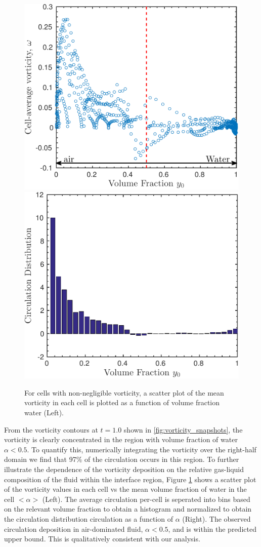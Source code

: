 \begin{figure}[h]
  \centering
  \includegraphics[width=.48\textwidth]{./figs/lung_figs/vorticity_vs_y0} \hfill
  \includegraphics[width=.48\textwidth]{./figs/lung_figs/circ_y0_dist2}
  \caption{For cells with non-negligible vorticity, a scatter plot of the mean vorticity in each cell is plotted as a function of volume fraction water (Left).  }
  \label{fig:baroclinic_y0_distribution}  
\end{figure}

From the vorticity contours at $t=1.0$ shown in
\ref{fig:vorticity_snapshots}, the vorticity is clearly concentrated
in the region with volume fraction of water $\alpha<0.5$. To quantify
this, numerically integrating the vorticity over the right-half domain
we find that 97\% of the circulation occurs in this region. To further
illustrate the dependence of the vorticity deposition on the relative
gas-liquid composition of the fluid within the interface region,
Figure \ref{fig:baroclinic_y0_distribution} shows a scatter plot of
the vorticity values in each cell vs the mean volume fraction of water
in the cell $<\alpha>$ (Left). The average circulation per-cell is
seperated into bins based on the relevant volume fraction to obtain a
histogram and normalized to obtain the circulation distribution
circulation as a function of $\alpha$ (Right). The observed circulation
deposition in air-dominated fluid, $\alpha<0.5$, and is within the
predicted upper bound. This is qualitatively consistent with our
analysis.

